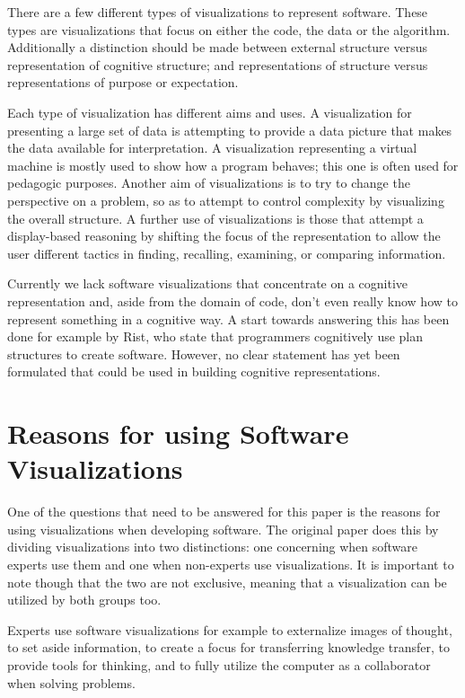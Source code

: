 \documentclass[11pt, a4paper, ngerman, twoside]{article}
\theoremstyle{plain}\newtheorem{Lemma}{Lemma}
\theoremstyle{plain}\newtheorem{Satz}[Lemma]{Satz}
\theoremstyle{definition}\newtheorem{Definition}[Lemma]{Definition}
\theoremstyle{definition}\newtheorem*{Beispiel}{Beispiel}
\theoremstyle{remark}\newtheorem*{Bemerkung}{Bemerkung}
\begin{document}
There are a few different types of visualizations to represent software. These types are visualizations that focus on either the code, the data or the algorithm\cite{myers}. Additionally a distinction should be made between external structure versus representation of cognitive structure; and representations of structure versus representations of purpose or expectation\cite{origin}.

Each type of visualization has different aims and uses. A visualization for presenting a large set of data is attempting to provide a data picture that makes the data available for interpretation. A visualization representing a virtual machine is mostly used to show how a program behaves; this one is often used for pedagogic purposes. Another aim of visualizations is to try to change the perspective on a problem, so as to attempt to control complexity by visualizing the overall structure. A further use of visualizations is those that attempt a display-based reasoning by shifting the focus of the representation to allow the user different tactics in finding, recalling, examining, or comparing information\cite{davies1993}\cite{davies1996}.

Currently we lack software visualizations that concentrate on a cognitive representation and, aside from the domain of code, don't even really know how to represent something in a cognitive way. A start towards answering this has been done for example by Rist\cite{rist1996}, who state that programmers cognitively use plan structures to create software. However, no clear statement has yet been formulated that could be used in building cognitive representations.

\section{Reasons for using Software Visualizations}

One of the questions that need to be answered for this paper is the reasons for using visualizations when developing software. The original paper does this by dividing visualizations into two distinctions: one concerning when software experts use them and one when non-experts use visualizations. It is important to note though that the two are not exclusive, meaning that a visualization can be utilized by both groups too.

Experts use software visualizations for example to externalize images of thought, to set aside information, to create a focus for transferring knowledge transfer, to provide tools for thinking, and to fully utilize the computer as a collaborator when solving problems.
\end{document}
